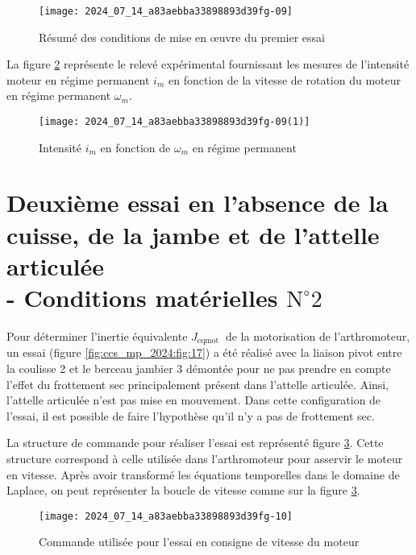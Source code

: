 \begin{figure}[!h]\centering
\texttt{[image: 2024\_07\_14\_a83aebba33898893d39fg-09]}

\caption{\label{fig:ccs_mp_2024:fig:13}Résumé des conditions de mise en œuvre du premier essai}
\end{figure}
La figure \ref{fig:ccs_mp_2024:fig:14} représente le relevé expérimental fournissant les mesures de l'intensité moteur en régime permanent $i_{m}$ en fonction de la vitesse de rotation du moteur en régime permanent $\omega_{m}$.


\begin{figure}[!h]\centering
\texttt{[image: 2024\_07\_14\_a83aebba33898893d39fg-09(1)]}
\caption{\label{fig:ccs_mp_2024:fig:14}Intensité $i_{m}$ en fonction de $\omega_{m}$ en régime permanent}
\end{figure}
\section*{Deuxième essai en l'absence de la cuisse, de la jambe et de l'attelle articulée \\
 - Conditions matérielles $\mathrm{N}^{\circ} 2$}
Pour déterminer l'inertie équivalente $J_{\text {eqmot }}$ de la motorisation de l'arthromoteur, un essai (figure \ref{fig:ccs_mp_2024:fig:17}) a été réalisé avec la liaison pivot entre la coulisse 2 et le berceau jambier 3 démontée pour ne pas prendre en compte l'effet du frottement sec principalement présent dans l'attelle articulée. Ainsi, l'attelle articulée n'est pas mise en mouvement. Dans cette configuration de l'essai, il est possible de faire l'hypothèse qu'il n'y a pas de frottement sec.

La structure de commande pour réaliser l'essai est représenté figure \ref{fig:ccs_mp_2024:fig:15}. Cette structure correspond à celle utilisée dans l'arthromoteur pour asservir le moteur en vitesse. Après avoir transformé les équations temporelles dans le domaine de Laplace, on peut représenter la boucle de vitesse comme sur la figure \ref{fig:ccs_mp_2024:fig:15}.

\begin{figure}[!h]\centering
\texttt{[image: 2024\_07\_14\_a83aebba33898893d39fg-10]}
\caption{\label{fig:ccs_mp_2024:fig:15}Commande utilisée pour l'essai en consigne de vitesse du moteur}
\end{figure}

